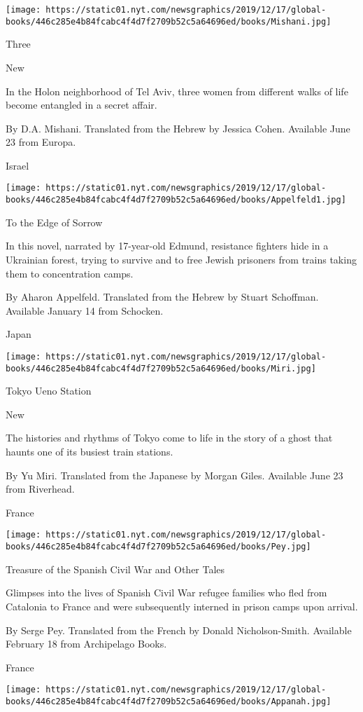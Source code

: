 \texttt{[image: https://static01.nyt.com/newsgraphics/2019/12/17/global-books/446c285e4b84fcabc4f4d7f2709b52c5a64696ed/books/Mishani.jpg]}

Three

New

In the Holon neighborhood of Tel Aviv, three women from different walks
of life become entangled in a secret affair.

 By D.A. Mishani. Translated from the Hebrew by Jessica Cohen. Available
June 23 from Europa.

Israel

\texttt{[image: https://static01.nyt.com/newsgraphics/2019/12/17/global-books/446c285e4b84fcabc4f4d7f2709b52c5a64696ed/books/Appelfeld1.jpg]}

To the Edge of Sorrow

In this novel, narrated by 17-year-old Edmund, resistance fighters hide
in a Ukrainian forest, trying to survive and to free Jewish prisoners
from trains taking them to concentration camps.

 By Aharon Appelfeld. Translated from the Hebrew by Stuart Schoffman.
Available January 14 from Schocken.

Japan

\texttt{[image: https://static01.nyt.com/newsgraphics/2019/12/17/global-books/446c285e4b84fcabc4f4d7f2709b52c5a64696ed/books/Miri.jpg]}

Tokyo Ueno Station

New

The histories and rhythms of Tokyo come to life in the story of a ghost
that haunts one of its busiest train stations.

 By Yu Miri. Translated from the Japanese by Morgan Giles. Available
June 23 from Riverhead.

France

\texttt{[image: https://static01.nyt.com/newsgraphics/2019/12/17/global-books/446c285e4b84fcabc4f4d7f2709b52c5a64696ed/books/Pey.jpg]}

Treasure of the Spanish Civil War and Other Tales

Glimpses into the lives of Spanish Civil War refugee families who fled
from Catalonia to France and were subsequently interned in prison camps
upon arrival.

 By Serge Pey. Translated from the French by Donald Nicholson-Smith.
Available February 18 from Archipelago Books.

France

\texttt{[image: https://static01.nyt.com/newsgraphics/2019/12/17/global-books/446c285e4b84fcabc4f4d7f2709b52c5a64696ed/books/Appanah.jpg]}

